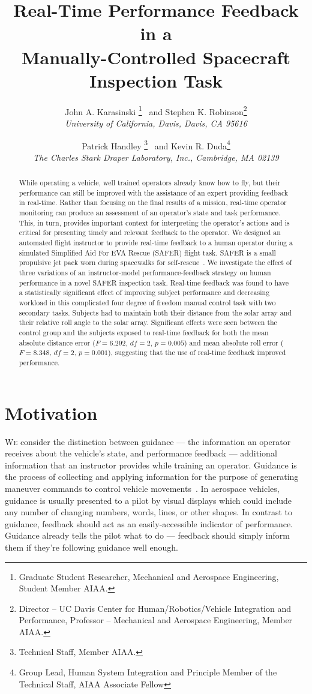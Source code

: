 \documentclass[]{aiaa-tc}%
\title{Real-Time Performance Feedback in a \\Manually-Controlled Spacecraft Inspection Task}
\author{
John A. Karasinski%
  \thanks{Graduate Student Researcher, Mechanical and Aerospace Engineering, Student Member AIAA.}
\ and Stephen K. Robinson\thanks{Director – UC Davis Center for Human/Robotics/Vehicle Integration and Performance, Professor – Mechanical and Aerospace Engineering, Member AIAA.}\\
{\normalsize\itshape
 University of California, Davis, Davis, CA 95616}\\
\and
Patrick Handley%
  \thanks{Technical Staff, Member AIAA.}
\ and Kevin R. Duda\thanks{Group Lead, Human System Integration and Principle Member of the Technical Staff, AIAA Associate Fellow}\\
{\normalsize\itshape
 The Charles Stark Draper Laboratory, Inc., Cambridge, MA 02139}\\
}
\begin{document}
\maketitle

\begin{abstract}
  While operating a vehicle, well trained operators already know how to fly, but their performance can still be improved with the assistance of an expert providing feedback in real-time. Rather than focusing on the final results of a mission, real-time operator monitoring can produce an assessment of an operator's state and task performance. This, in turn, provides important context for interpreting the operator's actions and is critical for presenting timely and relevant feedback to the operator. We designed an automated flight instructor to provide real-time feedback to a human operator during a simulated Simplified Aid For EVA Rescue (SAFER) flight task. SAFER is a small propulsive jet pack worn during spacewalks for self-rescue~\cite{safer}. We investigate the effect of three variations of an instructor-model performance-feedback strategy on human performance in a novel SAFER inspection task. Real-time feedback was found to have a statistically significant effect of improving subject performance and decreasing workload in this complicated four degree of freedom manual control task with two secondary tasks. Subjects had to maintain both their distance from the solar array and their relative roll angle to the solar array. Significant effects were seen between the control group and the subjects exposed to real-time feedback for both the mean absolute distance error ($F=6.292$, $df = 2$, $p = 0.005$) and mean absolute roll error ($F=8.348$, $df = 2$, $p = 0.001$), suggesting that the use of real-time feedback improved performance.
\end{abstract}

\section{Motivation}
\lettrine[nindent=0pt]{W}{e}
consider the distinction between guidance --- the information an operator receives about the vehicle's state, and performance feedback --- additional information that an instructor provides while training an operator. Guidance is the process of collecting and applying information for the purpose of generating maneuver commands to control vehicle movements~\cite{draper1965guidance}. In aerospace vehicles, guidance is usually presented to a pilot by visual displays which could include any number of changing numbers, words, lines, or other shapes. In contrast to guidance, feedback should act as an easily-accessible indicator of performance. Guidance already tells the pilot what to do --- feedback should simply inform them if they're following guidance well enough.
\end{document}
